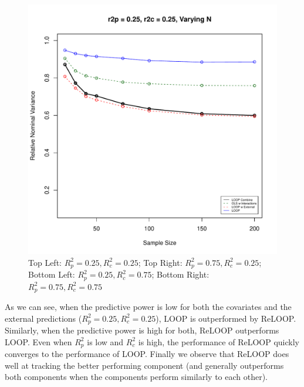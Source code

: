 \begin{figure}[H]
	\includegraphics[width=.49\linewidth,page = 4]{images/sampsize.pdf} \quad
	\caption{Top Left: $R^2_p = 0.25, R^2_c = 0.25$; Top Right: $R^2_p = 0.75, R^2_c = 0.25$; Bottom Left: $R^2_p = 0.25, R^2_c = 0.75$; Bottom Right: $R^2_p = 0.75, R^2_c = 0.75$}
\end{figure}
As we can see, when the predictive power is low for both the covariates and the external predictions ($R^2_p = 0.25, R^2_c = 0.25$), LOOP is outperformed by ReLOOP. Similarly, when the predictive power is high for both, ReLOOP outperforms LOOP. Even when $R^2_p$ is low and $R^2_c$ is high, the performance of ReLOOP quickly converges to the performance of LOOP. Finally we observe that ReLOOP does well at tracking the better performing component (and generally outperforms both components when the components perform similarly to each other).


